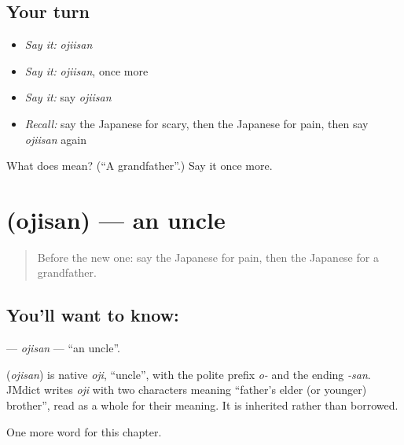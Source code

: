 \subsection*{Your turn}
\begin{itemize}
\raggedright
  \item \emph{Say it:} \emph{ojiisan}
  \item \emph{Say it:} \emph{ojiisan}, once more
  \item \emph{Say it:} say \emph{ojiisan}
  \item \emph{Recall:} say the Japanese for scary, then the Japanese for pain, then say \emph{ojiisan} again
\end{itemize}

\begin{tcolorbox}[breakable,colback=teal!4,colframe=teal!35!black,title={Before you move on}]
What does  mean? (\textquotedblleft{}A grandfather\textquotedblright{}.) Say it once more.
\end{tcolorbox}
\section[\texorpdfstring{\ja{おじさん} (ojisan)}{おじさん (ojisan)}]{ (ojisan) — an uncle}

\label{lesson:JA-C24-ojisan}



\begin{quote}
Before the new one: say the Japanese for pain, then the Japanese for a grandfather.
\end{quote}

\subsection*{You'll want to know: }
\textbf{} — \emph{ojisan} — \textquotedblleft{}an uncle\textquotedblright{}.

\begin{cousinweb}
\textbf{} (\emph{ojisan}) is native \emph{oji}, \textquotedblleft{}uncle\textquotedblright{}, with the polite prefix \emph{o-} and the ending \emph{-san}. JMdict writes \emph{oji} with two characters meaning \textquotedblleft{}father's elder (or younger) brother\textquotedblright{}, read as a whole for their meaning. It is inherited rather than borrowed.
\end{cousinweb}

\begin{grammarlens}[title={What you've built}]
One more word for this chapter.
\end{grammarlens}

